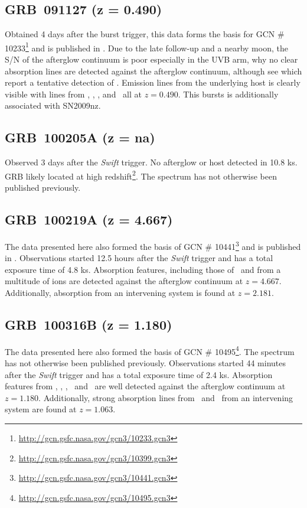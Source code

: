 \documentclass{aa}    %
\begin{document}
\subsection{GRB~091127 (z = 0.490)}
Obtained 4 days after the burst trigger, this data forms the basis for GCN \#
10233\footnote{\url{http://gcn.gsfc.nasa.gov/gcn3/10233.gcn3}} and is published
in \citet{Vergani2011}. Due to the late follow-up and a nearby moon, the S/N of
the afterglow continuum is poor especially in the UVB arm, why no clear
absorption lines are detected against the afterglow continuum, although see
\citet{Vergani2011} which report a tentative detection of \mgii. Emission lines
from the underlying host is clearly visible with lines from \oii, \hb, \oiii,
and \ha~all at $z = 0.490$. This bursts is additionally associated with
SN2009nz.

\subsection{GRB~100205A  (z = na)}
Observed 3 days after the \textit{Swift} trigger. No afterglow or host detected
in 10.8 ks. GRB likely located at high
redshift\footnote{\url{http://gcn.gsfc.nasa.gov/gcn3/10399.gcn3}}. The spectrum
has not otherwise been published previously.

\subsection{GRB~100219A (z = 4.667)}
The data presented here also formed the basis of GCN \#
10441\footnote{\url{http://gcn.gsfc.nasa.gov/gcn3/10441.gcn3}} and is published
in \citet{Thone2013}. Observations started 12.5 hours after the \textit{Swift}
trigger and has a total exposure time of 4.8 ks. Absorption features, including
those of \lya~and from a multitude of ions are detected against the afterglow
continuum at $z = 4.667$. Additionally, absorption from an intervening system
is found at $z = 2.181$.

\subsection{GRB~100316B (z = 1.180)}
The data presented here also formed the basis of GCN \#
10495\footnote{\url{http://gcn.gsfc.nasa.gov/gcn3/10495.gcn3}}. The spectrum
has not otherwise been published previously. Observations started 44 minutes
after the \textit{Swift} trigger and has a total exposure time of 2.4 ks.
Absorption features from \feii, \alii, \aliii,	\mgii~and \mgi~are well detected
against the afterglow continuum at $z = 1.180$. Additionally, strong absorption
lines from \feii~and \mgii~from an intervening system are found at $z = 1.063$.
\end{document}
